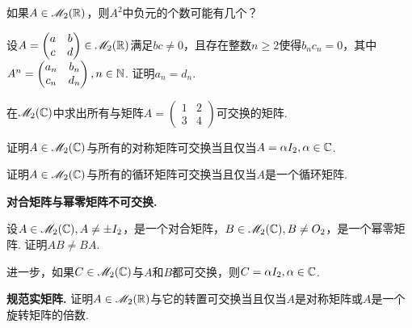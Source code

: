 \begin{problem}
  如果$A\in\mathscr M_2(\mathbb R)$，则$A^2$中负元的个数可能有几个？
\end{problem}

\begin{problem}
  设$A=\begin{pmatrix}
    a & b \\
    c & d
  \end{pmatrix}\in\mathscr M_2(\mathbb R)$满足$bc\ne0$，且存在整数$n\ge2$使得$b_nc_n=0$，其中$A^n=\begin{pmatrix}
    a_n & b_n \\
    c_n & d_n
  \end{pmatrix},n\in\mathbb N$. 证明$a_n=d_n$.
\end{problem}

\begin{problem}
  在$\mathscr M_2(\mathbb C)$中求出所有与矩阵$A=\begin{pmatrix}
    1 & 2 \\
    3 & 4
  \end{pmatrix}$可交换的矩阵.
\end{problem}

\begin{problem}
  \begin{enumerate*}[label=(\alph*),
      itemjoin=\\\hspace*{\parindent}]
    \item 证明$A\in\mathscr M_2(\mathbb C)$与所有的对称矩阵可交换当且仅当$A=\alpha I_2,\alpha\in\mathbb C$.
    \item 证明$A\in\mathscr M_2(\mathbb C)$与所有的循环矩阵可交换当且仅当$A$是一个循环矩阵.
  \end{enumerate*}
\end{problem}

\begin{problem}
  {\bfseries 对合矩阵与幂零矩阵不可交换.}

  设$A\in\mathscr M_2(\mathbb C),A\ne\pm I_2$，是一个对合矩阵，$B\in\mathscr M_2(\mathbb C),B\ne O_2$，是一个幂零矩阵. 证明$AB\ne BA$.

  进一步，如果$C\in\mathscr M_2(\mathbb C)$与$A$和$B$都可交换，则$C=\alpha I_2,\alpha\in\mathbb C$.
\end{problem}

\begin{mybox}
  \begin{problem}
    {\bfseries 规范实矩阵.} 证明$A\in\mathscr M_2(\mathbb R)$与它的转置可交换当且仅当$A$是对称矩阵或$A$是一个旋转矩阵的倍数.
  \end{problem}
\end{mybox}

